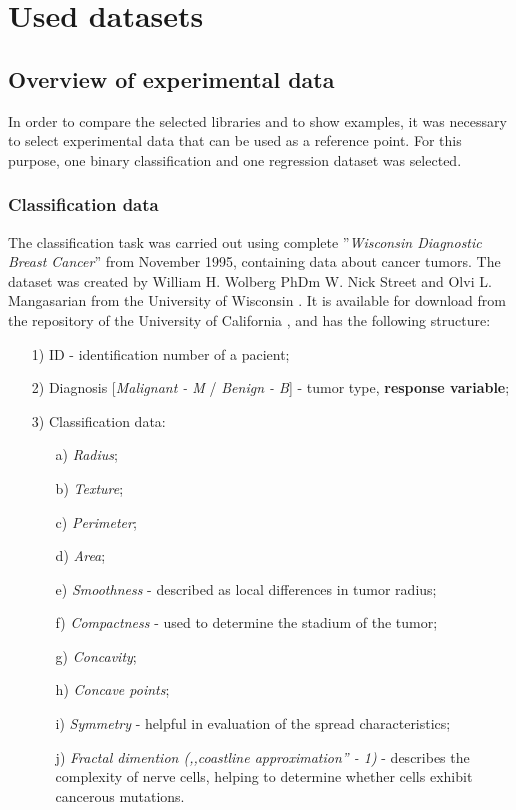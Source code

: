 \chapter{Used datasets}
\section{Overview of experimental data}

In order to compare the selected libraries and to show examples, it was necessary to select experimental data that can be used as a reference point. For this purpose, one binary classification and one regression dataset was selected.

\subsection{Classification data}
	
	 The classification task was carried out using complete ''\textit{Wisconsin Diagnostic Breast Cancer}'' from November 1995, containing data about cancer tumors. The dataset was created by William H. Wolberg PhDm W. Nick Street and Olvi L. Mangasarian from the University of Wisconsin \cite{wisconsin}. It is available for download from the repository of the University of California \cite{Dua:2019}, and has the following structure:
	 
	\begin{enumerate}
		\item [1)] ID - identification number of a pacient;
		\item [2)] Diagnosis [\textit{Malignant - M} / \textit{Benign - B}] - tumor type, \textbf{response variable};
		\item [3)] Classification data:
			\begin{enumerate}
				\item [a)] \textit{Radius};
				\item [b)] \textit{Texture};
				\item [c)] \textit{Perimeter};
				\item [d)] \textit{Area};
				\item [e)] \textit{Smoothness} - described as local differences in tumor radius;
				\item [f)] \textit{Compactness} - used to determine the stadium of the tumor;
				\item [g)] \textit{Concavity};
				\item [h)] \textit{Concave points};
				\item [i)] \textit{Symmetry} - helpful in evaluation of the spread characteristics;
				\item [j)] \textit{Fractal dimention (,,coastline approximation'' - 1)} - describes the complexity of nerve cells, helping to determine whether cells exhibit cancerous mutations.
			\end{enumerate}
	\end{enumerate}
	
